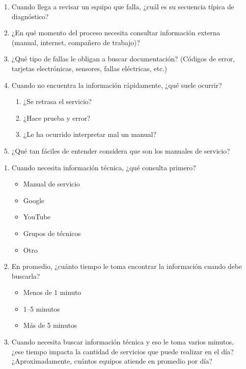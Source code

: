 {{    

    \begin{enumerate}[label=\arabic*., leftmargin=*, nosep, start=5]
        \item Cuando llega a revisar un equipo que falla, ¿cuál es su secuencia típica de diagnóstico?
        \item ¿En qué momento del proceso necesita consultar información externa (manual, internet, compañero de trabajo)?
        \item ¿Qué tipo de fallas le obligan a buscar documentación? (Códigos de error, tarjetas electrónicas, sensores, fallas eléctricas, etc.)
        \item Cuando no encuentra la información rápidamente, ¿qué suele ocurrir?
        \begin{enumerate}[label=\alph*., leftmargin=*, nosep]
            \item ¿Se retrasa el servicio?
            \item ¿Hace prueba y error?
            \item ¿Le ha ocurrido interpretar mal un manual?
        \end{enumerate}
        \item ¿Qué tan fáciles de entender considera que son los manuales de servicio?
    \end{enumerate}


    \begin{enumerate}[label=\arabic*., leftmargin=*, nosep, start=10]
        \item Cuando necesita información técnica, ¿qué consulta primero?
        \begin{itemize}[nosep, leftmargin=*]
            \item Manual de servicio
            \item Google
            \item YouTube
            \item Grupos de técnicos
            \item Otro
        \end{itemize}
        \item En promedio, ¿cuánto tiempo le toma encontrar la información cuando debe buscarla?
        \begin{itemize}[nosep, leftmargin=*]
            \item Menos de 1 minuto
            \item 1--5 minutos
            \item Más de 5 minutos
        \end{itemize}
        \item Cuando necesita buscar información técnica y eso le toma varios minutos, ¿ese tiempo impacta la cantidad de servicios que puede realizar en el día? ¿Aproximadamente, cuántos equipos atiende en promedio por día?
    \end{enumerate}

}}
